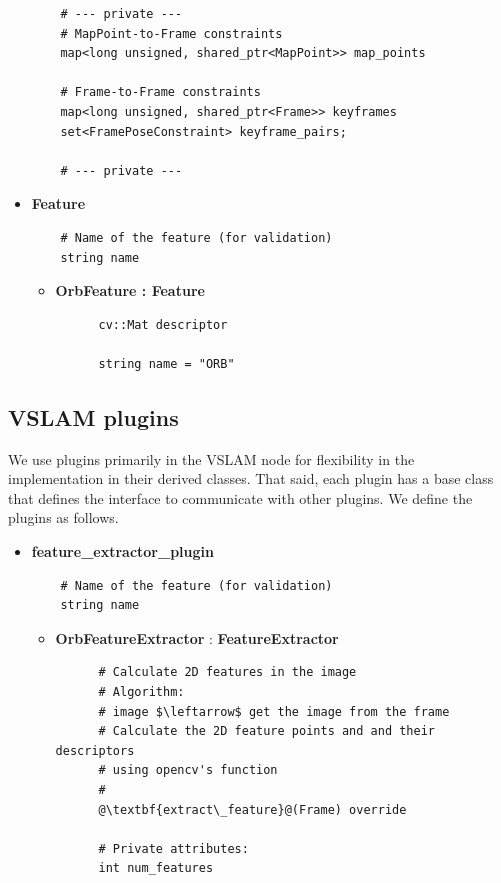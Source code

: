 \begin{itemize}
\begin{lstlisting}
    # --- private --- 
    # MapPoint-to-Frame constraints
    map<long unsigned, shared_ptr<MapPoint>> map_points
    
    # Frame-to-Frame constraints
    map<long unsigned, shared_ptr<Frame>> keyframes
    set<FramePoseConstraint> keyframe_pairs;

    # --- private --- 
  \end{lstlisting}


  \item \textbf{Feature}
  \begin{verbatim}
    # Name of the feature (for validation)
    string name
  \end{verbatim}
  
  \begin{itemize}
    \item \textbf{OrbFeature : Feature} 
    \begin{verbatim}
      cv::Mat descriptor

      string name = "ORB"
    \end{verbatim}
  \end{itemize}
\end{itemize}

\subsection{VSLAM plugins}

We use plugins primarily in the VSLAM node for flexibility in the implementation in their derived classes.
That said, each plugin has a base class that defines the interface to communicate with other plugins.
We define the plugins as follows.

\begin{itemize}
  \item \textbf{feature\_extractor\_plugin}
  
  \begin{verbatim}
    # Name of the feature (for validation)
    string name
  \end{verbatim}

  \begin{itemize}
    \item {\textbf{OrbFeatureExtractor} : \textbf{FeatureExtractor}}
    \begin{lstlisting}
      # Calculate 2D features in the image
      # Algorithm:
      # image $\leftarrow$ get the image from the frame
      # Calculate the 2D feature points and and their descriptors 
      # using opencv's function
      # 
      @\textbf{extract\_feature}@(Frame) override

      # Private attributes:
      int num_features
    \end{lstlisting}
    
  \end{itemize}
\end{itemize}

